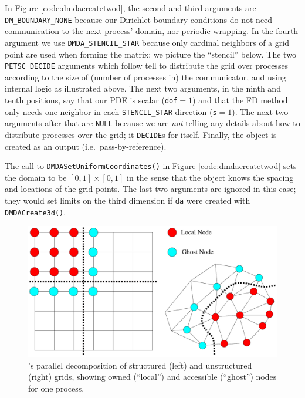 In Figure \ref{code:dmdacreatetwod}, the second and third arguments are \texttt{DM\_BOUNDARY\_NONE} because our Dirichlet boundary conditions do not need communication to the next process' domain, nor periodic wrapping.  In the fourth argument we use \texttt{DMDA\_STENCIL\_STAR} because only cardinal neighbors of a grid point are used when forming the matrix; we picture the ``stencil'' below.  The two \texttt{PETSC\_DECIDE} arguments which follow tell \PETSc to distribute the grid over \MPI processes according to the size of (number of processes in) the \MPI communicator, and using \PETSc internal logic as illustrated above.  The next two arguments, in the ninth and tenth positions, say that our PDE is scalar (\texttt{dof}$=1$) and that the FD method only needs one neighbor in each \texttt{STENCIL\_STAR} direction (\texttt{s}$=1$).  The next two arguments after that are \texttt{NULL} because we are \emph{not} telling \PETSc any details about how to distribute processes over the grid; it \texttt{DECIDE}s for itself.  Finally, the \pDMDA object is created as an output (i.e.~pass-by-reference).

The call to \texttt{DMDASetUniformCoordinates()} in Figure \ref{code:dmdacreatetwod} sets the domain to be $[0,1]\times[0,1]$ in the sense that the \pDM object knows the spacing and locations of the grid points.  The last two arguments are ignored in this case; they would set limits on the third dimension if \texttt{da} were created with \texttt{DMDACreate3d()}.

\medskip
\begin{figure}
\includegraphics[width=\textwidth]{petscghostvalues}
\caption{\PETSc's parallel decomposition of structured (left) and unstructured (right) grids, showing owned (``local'') and accessible (``ghost'') nodes for one process.}
\label{fig:petscghostvalues}
\end{figure}

